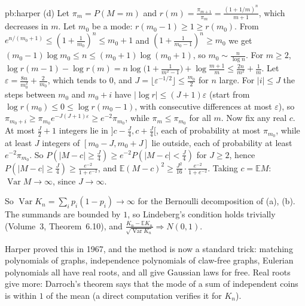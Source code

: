 \begin{solution}{pb:harper}
(d) Let $\pi_m=P(M=m)$ and $r(m)=\frac{\pi_{m+1}}{\pi_m}=\frac{(1+1/m)^n}{m+1}$, which decreases in $m$. Let $m_0$ be a mode: $r(m_0-1)\ge1\ge r(m_0)$. From
$e^{n/(m_0+1)}\le(1+\frac1{m_0})^n\le m_0+1$ and $(1+\frac1{m_0-1})^n\ge m_0$ we get $(m_0-1)\log m_0\le n\le(m_0+1)\log(m_0+1)$, so $m_0\sim\frac n{\log n}$.
For $m\ge2$, $\log r(m-1)-\log r(m)=n\log\bigl(1+\frac1{m^2-1}\bigr)+\log\frac{m+1}m\le\frac{2n}{m^2}+\frac1m$. Let $\varepsilon=\frac{8n}{m_0^2}+\frac2{m_0}$, which tends to $0$,
and $J=\lfloor\varepsilon^{-1/2}\rfloor\le\frac{m_0}2$ for $n$ large. For $|i|\le J$ the steps between $m_0$ and $m_0+i$ have $|\log r|\le(J+1)\varepsilon$ (start from
$\log r(m_0)\le0\le\log r(m_0-1)$, with consecutive differences at most $\varepsilon$), so $\pi_{m_0+i}\ge\pi_{m_0}e^{-J(J+1)\varepsilon}\ge e^{-2}\pi_{m_0}$, while $\pi_m\le\pi_{m_0}$ for
all $m$. Now fix any real $c$. At most $\frac J2+1$ integers lie in $]c-\frac J4,c+\frac J4[$, each of probability at most $\pi_{m_0}$, while at least $J$ integers of $[m_0-J,m_0+J]$ lie
outside, each of probability at least $e^{-2}\pi_{m_0}$. So $P(|M-c|\ge\frac J4)\ge e^{-2}P(|M-c|<\frac J4)$ for $J\ge2$, hence $P(|M-c|\ge\frac J4)\ge\frac{e^{-2}}{1+e^{-2}}$, and
$\mathbb E(M-c)^2\ge\frac{J^2}{16}\cdot\frac{e^{-2}}{1+e^{-2}}$. Taking $c=\mathbb EM$: $\operatorname{Var}M\to\infty$, since $J\to\infty$.

So $\operatorname{Var}K_n=\sum_ip_i(1-p_i)\to\infty$ for the Bernoulli decomposition of (a), (b). The summands are bounded by $1$, so Lindeberg's condition holds trivially
(Volume~3, Theorem~6.10), and $\frac{K_n-\mathbb EK_n}{\sqrt{\operatorname{Var}K_n}}\Rightarrow N(0,1)$.

\leads Harper proved this in 1967, and the method is now a standard trick: matching polynomials of graphs, independence polynomials of claw-free graphs, Eulerian
polynomials all have real roots, and all give Gaussian laws for free. Real roots give more: Darroch's theorem says that the mode of a sum of independent coins is within
$1$ of the mean (a direct computation verifies it for $K_n$).
\end{solution}

